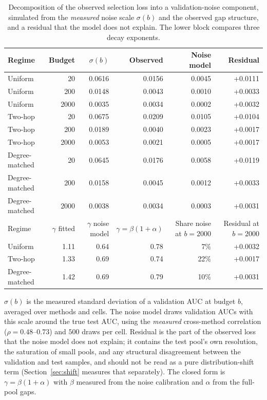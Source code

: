 \begin{table}[htbp]
\centering
\footnotesize
\caption{Decomposition of the observed selection loss into a validation-noise component, simulated from the \emph{measured} noise scale $\sigma(b)$ and the observed gap structure, and a residual that the model does not explain. The lower block compares three decay exponents.}
\label{tab:floor}
\begin{tabular}{l r r r r r}
\toprule
Regime & Budget & $\sigma(b)$ & Observed & Noise model & Residual \\
\midrule
Uniform & 20 & 0.0616 & 0.0156 & 0.0045 & +0.0111 \\
Uniform & 200 & 0.0148 & 0.0043 & 0.0010 & +0.0033 \\
Uniform & 2000 & 0.0035 & 0.0034 & 0.0002 & +0.0032 \\
\addlinespace[3pt]
Two-hop & 20 & 0.0675 & 0.0209 & 0.0105 & +0.0104 \\
Two-hop & 200 & 0.0189 & 0.0040 & 0.0023 & +0.0017 \\
Two-hop & 2000 & 0.0053 & 0.0021 & 0.0005 & +0.0017 \\
\addlinespace[3pt]
Degree-matched & 20 & 0.0645 & 0.0176 & 0.0058 & +0.0119 \\
Degree-matched & 200 & 0.0158 & 0.0045 & 0.0012 & +0.0033 \\
Degree-matched & 2000 & 0.0038 & 0.0034 & 0.0003 & +0.0031 \\
\addlinespace[3pt]
\midrule
Regime & $\gamma$ fitted & $\gamma$ noise model & $\gamma=\beta(1+\alpha)$ & Share noise at $b=2000$ & Residual at $b=2000$ \\
\midrule
Uniform & 1.11 & 0.64 & 0.78 & 7\% & +0.0032 \\
Two-hop & 1.33 & 0.69 & 0.74 & 22\% & +0.0017 \\
Degree-matched & 1.42 & 0.69 & 0.79 & 10\% & +0.0031 \\
\bottomrule
\end{tabular}
\par\vspace{2pt}\begin{minipage}{\linewidth}\footnotesize $\sigma(b)$ is the measured standard deviation of a validation AUC at budget $b$, averaged over methods and cells. The noise model draws validation AUCs with this scale around the true test AUC, using the \emph{measured} cross-method correlation ($\rho=0.48$--$0.73$) and $500$ draws per cell. Residual is the part of the observed loss that the noise model does not explain; it contains the test pool's own resolution, the saturation of small pools, and any structural disagreement between the validation and test samples, and should not be read as a pure distribution-shift term (Section~\ref{sec:shift} measures that separately). The closed form is $\gamma=\beta(1+\alpha)$ with $\beta$ measured from the noise calibration and $\alpha$ from the full-pool gaps.\end{minipage}
\end{table}
